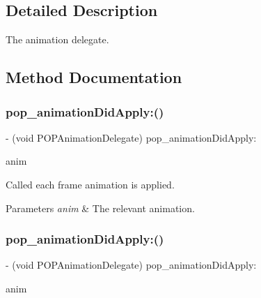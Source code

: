 \subsection{Detailed Description}
The animation delegate. 

\subsection{Method Documentation}
\mbox{\label{protocol_p_o_p_animation_delegate_01-p_ae6bba4e873d7baaad2d6e27e06a5c6d4}} 
\subsubsection{\texorpdfstring{pop\+\_\+animation\+Did\+Apply\+:()}{pop\_animationDidApply:()}\hspace{0.1cm}{\footnotesize\ttfamily [1/3]}}
{\footnotesize\ttfamily -\/ (void P\+O\+P\+Animation\+Delegate) pop\+\_\+animation\+Did\+Apply\+: \begin{DoxyParamCaption}\item[{(\mbox{\hyperlink{interface_p_o_p_animation}{P\+O\+P\+Animation}} $\ast$)}]{anim }\end{DoxyParamCaption}\hspace{0.3cm}{\ttfamily [optional]}}

Called each frame animation is applied. 
\begin{DoxyParams}{Parameters}
{\em anim} & The relevant animation. \\
\hline
\end{DoxyParams}
\mbox{\label{protocol_p_o_p_animation_delegate_01-p_ae6bba4e873d7baaad2d6e27e06a5c6d4}} 
\subsubsection{\texorpdfstring{pop\+\_\+animation\+Did\+Apply\+:()}{pop\_animationDidApply:()}\hspace{0.1cm}{\footnotesize\ttfamily [2/3]}}
{\footnotesize\ttfamily -\/ (void P\+O\+P\+Animation\+Delegate) pop\+\_\+animation\+Did\+Apply\+: \begin{DoxyParamCaption}\item[{(\mbox{\hyperlink{interface_p_o_p_animation}{P\+O\+P\+Animation}} $\ast$)}]{anim }\end{DoxyParamCaption}\hspace{0.3cm}{\ttfamily [optional]}}

